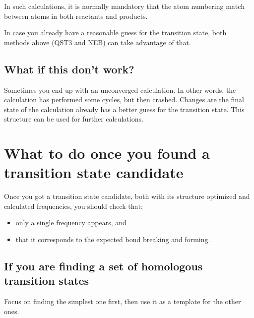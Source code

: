 In such calculations, it is normally mandatory that the atom numbering match
between atoms in both reactants and products.

In case you already have a reasonable guess for the transition state, both
methods above (QST3 and NEB) can take advantage of that.

\subsection{What if this don't work?}

Sometimes you end up with an unconverged calculation.
In other words, the calculation has performed some cycles, but then crashed.
Changes are the final state of the calculation already has a better guess for
the transition state.
This structure can be used for further calculations.

\section{What to do once you found a transition state candidate}

Once you got a transition state candidate, both with its structure optimized
and calculated frequencies, you should check that:
%
\begin{itemize}
	\item only a single frequency appears, and
	\item that it corresponds to the expected bond breaking and forming.
\end{itemize}

\subsection{If you are finding a set of homologous transition states}

Focus on finding the simplest one first, then use it as a template for the
other ones.
